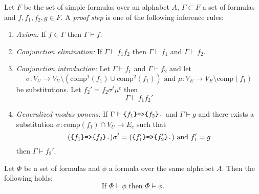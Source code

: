 \begin{definition}\label{proofsteps}
Let $F$ be the set of simple formulas over an \nthree alphabet $A$, $\Gamma\subset F$ a set of formulas and
$f,f_1,f_2, g\in F$. 
A \textit{proof step} is one of the following inference rules:
\begin{enumerate}
 \item \emph{Axiom:} If $f \in \Gamma$ then $\Gamma \vdash f$.%
 \item \emph{Conjunction elimination:} If $\Gamma \vdash f_1f_2$ then $\Gamma \vdash f_1$ and $\Gamma \vdash f_2$.
 \item \emph{Conjunction introduction:} Let $\Gamma\vdash f_1$ and $\Gamma \vdash f_2$ and 
 let \[\sigma: V_U\rightarrow V_U\setminus(\text{comp}^1(f_1)\cup\text{comp}^2(f_1)) 
 \text{ and } %
 \mu:V_E\rightarrow V_E\setminus \text{comp}(f_1)\] be substitutions. Let $f_2'= f_2\sigma^t\mu^c$ 
then \[\Gamma \vdash f_1f_2'\]
 \item \emph{Generalized modus ponens:} If $\Gamma \vdash \verb!{!f_1\verb!}=>{!f_2\verb!}.!$ and $\Gamma \vdash g$ %
 and there exists a substitution $\sigma:\text{comp}(f_1)\cap V_U \rightarrow E_e$ such that 
 \[
  (\verb!{!f_1\verb!}=>{!f_2\verb!}.!)\sigma^t= (\verb!{!f_1'\verb!}=>{!f_2'\verb!}.!)\text{ and }
 f'_1=g\] 
then $\Gamma \vdash f_2'$.
 \end{enumerate}
\end{definition}


\begin{theorem}\label{correctness}
Let $\Phi$ be a set of \nthree formulas  and $\phi$ a formula over the same \nthree alphabet $A$.  Then the following holds:
\[ \text{If } \Phi \vdash \phi \text{ then } \Phi \models \phi.\]
\end{theorem}

